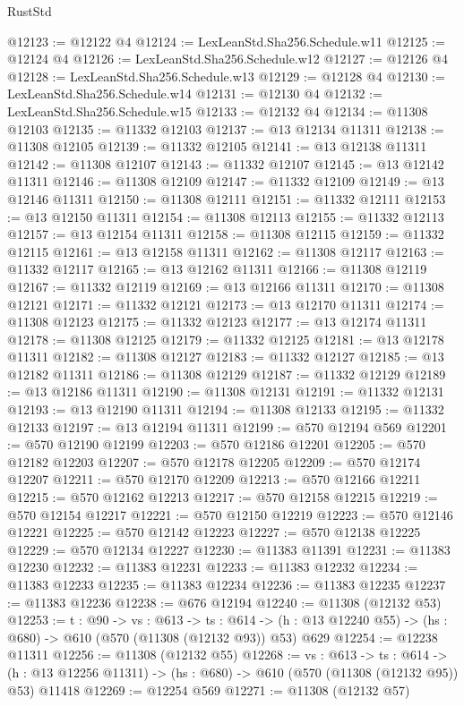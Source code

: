 \begin{lexlean}{RustStd}
\begin{coremodule}
@12123 := @12122 @4
@12124 := LexLeanStd.Sha256.Schedule.w11
@12125 := @12124 @4
@12126 := LexLeanStd.Sha256.Schedule.w12
@12127 := @12126 @4
@12128 := LexLeanStd.Sha256.Schedule.w13
@12129 := @12128 @4
@12130 := LexLeanStd.Sha256.Schedule.w14
@12131 := @12130 @4
@12132 := LexLeanStd.Sha256.Schedule.w15
@12133 := @12132 @4
@12134 := @11308 @12103
@12135 := @11332 @12103
@12137 := @13 @12134 @11311
@12138 := @11308 @12105
@12139 := @11332 @12105
@12141 := @13 @12138 @11311
@12142 := @11308 @12107
@12143 := @11332 @12107
@12145 := @13 @12142 @11311
@12146 := @11308 @12109
@12147 := @11332 @12109
@12149 := @13 @12146 @11311
@12150 := @11308 @12111
@12151 := @11332 @12111
@12153 := @13 @12150 @11311
@12154 := @11308 @12113
@12155 := @11332 @12113
@12157 := @13 @12154 @11311
@12158 := @11308 @12115
@12159 := @11332 @12115
@12161 := @13 @12158 @11311
@12162 := @11308 @12117
@12163 := @11332 @12117
@12165 := @13 @12162 @11311
@12166 := @11308 @12119
@12167 := @11332 @12119
@12169 := @13 @12166 @11311
@12170 := @11308 @12121
@12171 := @11332 @12121
@12173 := @13 @12170 @11311
@12174 := @11308 @12123
@12175 := @11332 @12123
@12177 := @13 @12174 @11311
@12178 := @11308 @12125
@12179 := @11332 @12125
@12181 := @13 @12178 @11311
@12182 := @11308 @12127
@12183 := @11332 @12127
@12185 := @13 @12182 @11311
@12186 := @11308 @12129
@12187 := @11332 @12129
@12189 := @13 @12186 @11311
@12190 := @11308 @12131
@12191 := @11332 @12131
@12193 := @13 @12190 @11311
@12194 := @11308 @12133
@12195 := @11332 @12133
@12197 := @13 @12194 @11311
@12199 := @570 @12194 @569
@12201 := @570 @12190 @12199
@12203 := @570 @12186 @12201
@12205 := @570 @12182 @12203
@12207 := @570 @12178 @12205
@12209 := @570 @12174 @12207
@12211 := @570 @12170 @12209
@12213 := @570 @12166 @12211
@12215 := @570 @12162 @12213
@12217 := @570 @12158 @12215
@12219 := @570 @12154 @12217
@12221 := @570 @12150 @12219
@12223 := @570 @12146 @12221
@12225 := @570 @12142 @12223
@12227 := @570 @12138 @12225
@12229 := @570 @12134 @12227
@12230 := @11383 @11391
@12231 := @11383 @12230
@12232 := @11383 @12231
@12233 := @11383 @12232
@12234 := @11383 @12233
@12235 := @11383 @12234
@12236 := @11383 @12235
@12237 := @11383 @12236
@12238 := @676 @12194
@12240 := @11308 (@12132 @53)
@12253 := {t : @90} ->
  {vs : @613} ->
  {ts : @614} -> (h : @13 @12240 @55) -> (hs : @680) -> @610 (@570 (@11308 (@12132 @93)) @53) @629
@12254 := @12238 @11311
@12256 := @11308 (@12132 @55)
@12268 := {vs : @613} ->
  {ts : @614} ->
  (h : @13 @12256 @11311) -> (hs : @680) -> @610 (@570 (@11308 (@12132 @95)) @53) @11418
@12269 := @12254 @569
@12271 := @11308 (@12132 @57)

\end{coremodule}
\end{lexlean}
